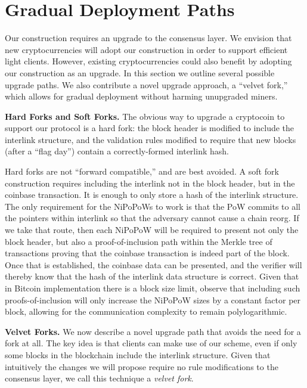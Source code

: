 \section{Gradual Deployment Paths}

\label{sec.forks}
Our construction requires an upgrade to the consensus layer. We envision that
new cryptocurrencies will adopt our construction in order to support efficient
light clients. However, existing cryptocurrencies could also benefit by adopting
our construction as an upgrade. In this section we outline several possible
upgrade paths. We also contribute a novel upgrade approach, a ``velvet fork,''
which allows for gradual deployment without harming unupgraded miners.

\medskip
\noindent 
{\bf Hard Forks and Soft Forks.}
The obvious way to upgrade a cryptocoin to support our protocol is a hard fork:
the block header is modified to include the interlink structure, and the
validation rules modified to require that new blocks (after a ``flag day'')
contain a correctly-formed interlink hash.

Hard forks are not ``forward compatible,'' and are best avoided. A soft fork
construction requires including the interlink not in the block
header, but in the coinbase transaction. It is enough to only store a hash of
the interlink structure. The only requirement for the NiPoPoWs to work is that the
PoW commits to all the pointers within interlink so that the adversary cannot
cause a chain reorg. If we take that route, then each NiPoPoW will be required to
present not only the block header, but also a proof-of-inclusion path within the
Merkle tree of transactions proving that the coinbase transaction is indeed part
of the block. Once that is established, the coinbase data can be presented, and
the verifier will thereby know that the hash of the interlink data structure is
correct. Given that in Bitcoin implementation there is a block size limit,
observe that including such proofs-of-inclusion will only increase the NiPoPoW
sizes by a constant factor per block, allowing for the communication complexity
to remain polylogarithmic.

\medskip
\noindent 
{\bf Velvet Forks.}
%
We now describe a novel upgrade path that avoids the need for a fork at all. The
key idea is that clients can make use of our scheme, even if only some blocks in
the blockchain include the interlink structure. Given that intuitively the 
changes we will propose require no rule modifications to the consensus layer, we call this
technique a \textit{velvet fork}.

